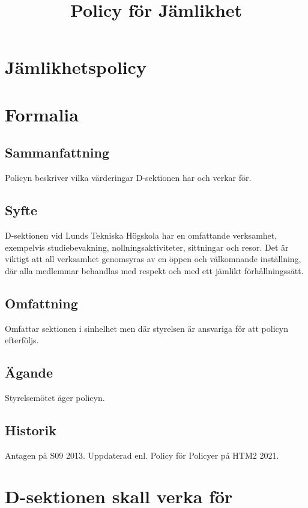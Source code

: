 \documentclass{dsekprotokoll}
\title{Policy för Jämlikhet}
\author{}
\begin{document}
\section*{Jämlikhetspolicy}
\section{Formalia}
\subsection{Sammanfattning}
Policyn beskriver vilka värderingar D-sektionen har och verkar för.
\subsection{Syfte}
D-sektionen vid Lunds Tekniska Högskola har en omfattande verksamhet, exempelvis studiebevakning, nollningsaktiviteter, sittningar och resor. Det är viktigt att all verksamhet
genomsyras av en öppen och välkomnande inställning, där alla medlemmar behandlas med
respekt och med ett jämlikt förhållningssätt.
\subsection{Omfattning}
Omfattar sektionen i sinhelhet men där styrelsen är ansvariga för att policyn efterföljs.
\subsection{Ägande}
Styrelsemötet äger policyn.
\subsection{Historik}
Antagen på S09 2013.
Uppdaterad enl. Policy för Policyer på HTM2 2021.


\section{D-sektionen skall verka för}
\end{document}

